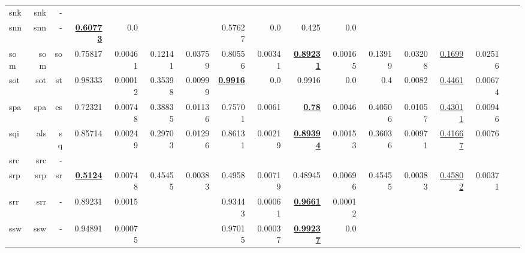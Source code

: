 \documentclass[11pt]{article}
\begin{document}
\begin{table*}[h]
{\begin{tabular}{lrrrrrrrrrrrrrrrr}
snk         & snk         & -         &          &          &          &          &          &          &          &          &          &          &          &          \\
snn         & snn         & -         & \textbf{\underline{0.60773}}         & 0.0         &          &          & 0.57627         & 0.0         & 0.425         & 0.0         &          &          &          &          \\
som         & som         & so         & 0.75817         & 0.00461         & 0.12141         & 0.03759         & 0.80556         & 0.00341         & \textbf{\underline{0.89231}}         & 0.00165         & 0.13919         & 0.03208         & \underline{0.1699}         & 0.02516         \\
sot         & sot         & st         & 0.98333         & 0.00012         & 0.35398         & 0.00999         & \textbf{\underline{0.9916}}         & 0.0         & 0.9916         & 0.0         & 0.4         & 0.0082         & \underline{0.4461}         & 0.00674         \\
spa         & spa         & es         & 0.72321         & 0.00748         & 0.38835         & 0.01136         & 0.75701         & 0.0061         & \textbf{\underline{0.78}}         & 0.0046         & 0.40506         & 0.01057         & \underline{0.43011}         & 0.00946         \\
sqi         & als         & sq         & 0.85714         & 0.00249         & 0.29703         & 0.01296         & 0.86131         & 0.00219         & \textbf{\underline{0.89394}}         & 0.00153         & 0.36036         & 0.00971         & \underline{0.41667}         & 0.0076         \\
src         & src         & -         &          &          &          &          &          &          &          &          &          &          &          &          \\
srp         & srp         & sr         & \textbf{\underline{0.5124}}         & 0.00748         & 0.45455         & 0.00383         & 0.4958         & 0.00719         & 0.48945         & 0.00696         & 0.45455         & 0.00383         & \underline{0.45802}         & 0.00371         \\
srr         & srr         & -         & 0.89231         & 0.0015         &          &          & 0.93443         & 0.00061         & \textbf{\underline{0.9661}}         & 0.00012         &          &          &          &          \\
ssw         & ssw         & -         & 0.94891         & 0.00075         &          &          & 0.97015         & 0.00037         & \textbf{\underline{0.99237}}         & 0.0         &          &          &          &          \\

\end{tabular}}
\end{table*}
\end{document}
